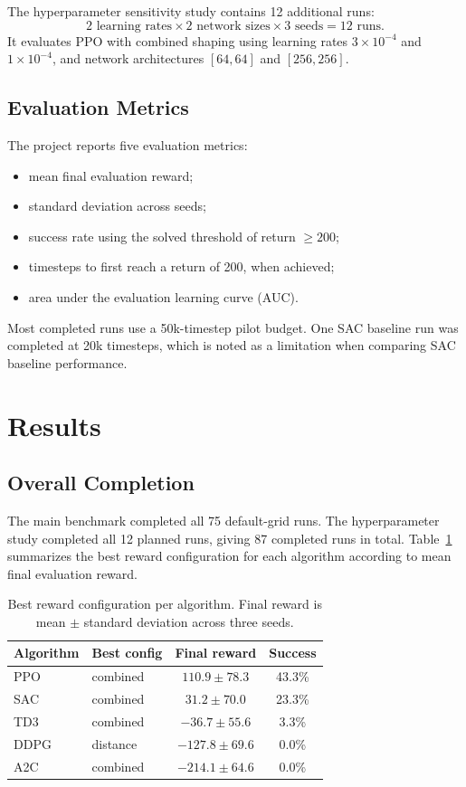 \documentclass[conference,10pt]{IEEEtran}
\begin{document}
The hyperparameter sensitivity study contains 12 additional runs:
\begin{equation}
    2 \text{ learning rates} \times 2 \text{ network sizes} \times 3 \text{ seeds} = 12 \text{ runs}.
\end{equation}
It evaluates PPO with combined shaping using learning rates $3\times10^{-4}$ and $1\times10^{-4}$, and network architectures $[64,64]$ and $[256,256]$.

\subsection{Evaluation Metrics}
The project reports five evaluation metrics:
\begin{itemize}
    \item mean final evaluation reward;
    \item standard deviation across seeds;
    \item success rate using the solved threshold of return $\geq 200$;
    \item timesteps to first reach a return of 200, when achieved;
    \item area under the evaluation learning curve (AUC).
\end{itemize}

Most completed runs use a 50k-timestep pilot budget. One SAC baseline run was completed at 20k timesteps, which is noted as a limitation when comparing SAC baseline performance.

\section{Results}
\subsection{Overall Completion}
The main benchmark completed all 75 default-grid runs. The hyperparameter study completed all 12 planned runs, giving 87 completed runs in total. Table~\ref{tab:best} summarizes the best reward configuration for each algorithm according to mean final evaluation reward.

\begin{table}[t]
\centering
\caption{Best reward configuration per algorithm. Final reward is mean $\pm$ standard deviation across three seeds.}
\label{tab:best}
\begin{tabular}{llcc}
\toprule
Algorithm & Best config & Final reward & Success \\
\midrule
PPO & combined & $110.9 \pm 78.3$ & 43.3\% \\
SAC & combined & $31.2 \pm 70.0$ & 23.3\% \\
TD3 & combined & $-36.7 \pm 55.6$ & 3.3\% \\
DDPG & distance & $-127.8 \pm 69.6$ & 0.0\% \\
A2C & combined & $-214.1 \pm 64.6$ & 0.0\% \\
\bottomrule
\end{tabular}
\end{table}
\end{document}
